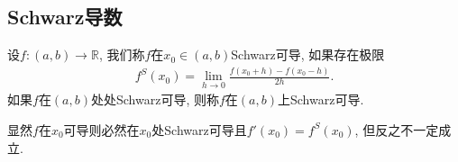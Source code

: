 \documentclass[../../main.tex]{subfiles}%
\begin{document}
\subsection{Schwarz导数}

\begin{definition}[Schwarz导数]\label{definition:Schwarz导数}
设$f:(a,b) \to \mathbb{R}$, 我们称$f$在$x_0 \in (a,b)$Schwarz可导, 如果存在极限
\begin{align}
f^S(x_0) = \lim_{h \to 0} \frac{f(x_0 + h) - f(x_0 - h)}{2h}. \label{eq:13.2348982334242te3fd938523i23903t3ger34t4234898938523i23903t3ger34t4106}
\end{align}
如果$f$在$(a,b)$处处Schwarz可导, 则称$f$在$(a,b)$上Schwarz可导.
\end{definition}
\begin{note}
显然$f$在$x_0$可导则必然在$x_0$处Schwarz可导且$f'(x_0) = f^S(x_0)$, 但反之不一定成立.
\end{note}
\end{document}

